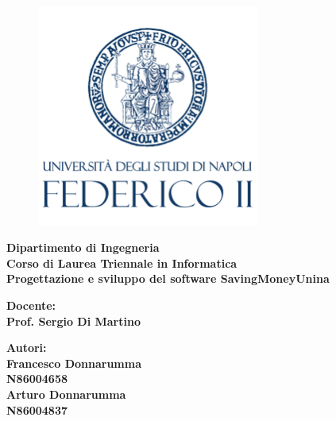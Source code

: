 \begin{titlepage} %
    \begin{figure}[t] %
        \centering\includegraphics[width=0.65\textwidth]{images/FII_logo.png}
    \end{figure}
    \vspace{20mm}
    
    \begin{Large}
     \begin{center}
        \textbf{Dipartimento di Ingegneria\\ Corso di Laurea Triennale in Informatica\\}
        \vspace{20mm}
        {\huge{\bf Progettazione e sviluppo del software SavingMoneyUnina}}\\
    \end{center}
    \end{Large}
    
    
    \vspace{36mm}
    \begin{minipage}[t]{0.47\textwidth}
        {\large{\bf Docente:\\ Prof. Sergio Di Martino}}
    \end{minipage}
    \hfill
    \begin{minipage}[t]{0.47\textwidth}\raggedleft
        {\large{\bf Autori: \\ Francesco Donnarumma\\ N86004658\\ Arturo Donnarumma\\ N86004837\\}}
    \end{minipage}
    
    \vspace{25mm}
    
    \hrulefill
    
    \vspace{5mm}
    
    
    \end{titlepage}